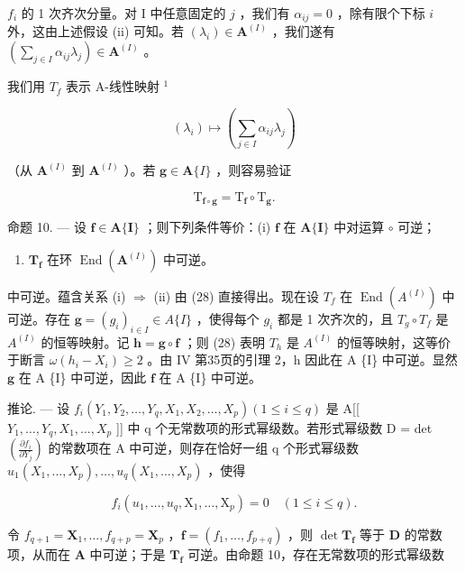 \(f_{i}\) 的 1 次齐次分量。对 I 中任意固定的 \(j\) ，我们有 \(\alpha_{ij} = 0\) ，除有限个下标 \(i\) 外，这由上述假设 (ii) 可知。若 \((\lambda_i) \in \mathbf{A}^{(I)}\) ，我们遂有 \(\left(\sum_{j \in I} \alpha_{ij} \lambda_j\right) \in \mathbf{A}^{(I)}\) 。

我们用 \(T_{f}\) 表示 A-线性映射 \(^{1}\)

\[
\left(\lambda_ {i}\right) \mapsto \left(\sum_ {j \in I} \alpha_ {i j} \lambda_ {j}\right)
\]

（从 \(\mathbf{A}^{(I)}\) 到 \(\mathbf{A}^{(I)}\) ）。若 \(\mathbf{g} \in \mathbf{A}\{I\}\) ，则容易验证

\[
\mathrm{T} _ {\mathbf {f} \circ \mathbf {g}} = \mathrm{T} _ {\mathbf {f}} \circ \mathrm{T} _ {\mathbf {g}}.\tag{28}
\]

命题 10. --- 设 \(\mathbf{f} \in \mathbf{A}\{\mathbf{I}\}\) ；则下列条件等价：(i) \(\mathbf{f}\) 在 \(\mathbf{A}\{\mathbf{I}\}\) 中对运算 \(\circ\) 可逆；

\begin{enumerate}
\def\labelenumi{(\roman{enumi})}
\setcounter{enumi}{1}
\tightlist
\item
  \(\mathbf{T}_{\mathbf{f}}\) 在环 \(\operatorname{End}(\mathbf{A}^{(I)})\) 中可逆。
\end{enumerate}

中可逆。蕴含关系 (i) \(\Rightarrow\) (ii) 由 (28) 直接得出。现在设 \(T_{f}\) 在 \(\operatorname{End}(A^{(I)})\) 中可逆。存在 \(\mathbf{g} = (g_i)_{i \in I} \in A\{I\}\) ，使得每个 \(g_i\) 都是 1 次齐次的，且 \(T_{g} \circ T_{f}\) 是 \(A^{(I)}\) 的恒等映射。记 \(\mathbf{h} = \mathbf{g} \circ \mathbf{f}\) ；则 (28) 表明 \(T_{h}\) 是 \(A^{(I)}\) 的恒等映射，这等价于断言 \(\omega(h_i - X_i) \geqslant 2\) 。由 IV 第35页的引理 2，h 因此在 A \{I\} 中可逆。显然 \(\mathbf{g}\) 在 A \{I\} 中可逆，因此 \(\mathbf{f}\) 在 A \{I\} 中可逆。

推论. --- 设 \(f_{i}(Y_{1}, Y_{2}, \ldots, Y_{q}, X_{1}, X_{2}, \ldots, X_{p}) (1 \leqslant i \leqslant q)\) 是 A{[}{[} \(Y_{1}, \ldots, Y_{q}, X_{1}, \ldots, X_{p}\) {]}{]} 中 q 个无常数项的形式幂级数。若形式幂级数 D = det \(\left(\frac{\partial f_{i}}{\partial Y_{j}}\right)\) 的常数项在 A 中可逆，则存在恰好一组 q 个形式幂级数 \(u_{1}(X_{1}, \ldots, X_{p}), \ldots, u_{q}(X_{1}, \ldots, X_{p})\) ，使得

\[
f _ {i} (u _ {1}, \dots , u _ {q}, \mathrm{X} _ {1}, \dots , \mathrm{X} _ {p}) = 0 \quad (1 \leqslant i \leqslant q).\tag{29}
\]

令 \(f_{q+1} = \mathbf{X}_1, \ldots, f_{q+p} = \mathbf{X}_p\) ，\(\mathbf{f} = (f_1, \ldots, f_{p+q})\) ，则 \(\det \mathbf{T}_{\mathbf{f}}\) 等于 \(\mathbf{D}\) 的常数项，从而在 \(\mathbf{A}\) 中可逆；于是 \(\mathbf{T}_{\mathbf{f}}\) 可逆。由命题 10，存在无常数项的形式幂级数

